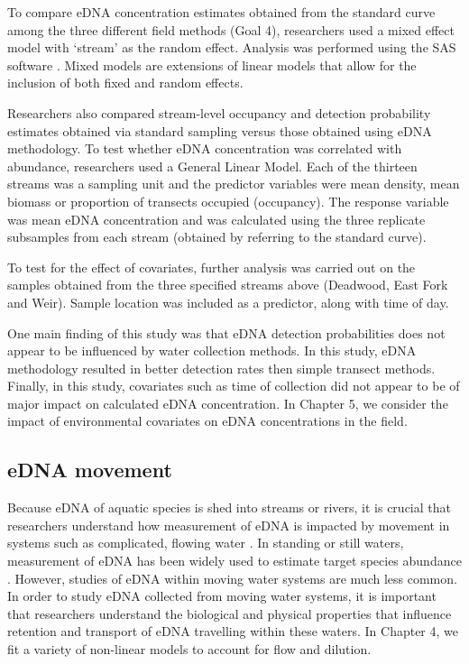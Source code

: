 \vspace{5mm}

To compare eDNA concentration estimates obtained from the standard curve among the three different field methods (Goal 4), researchers used a mixed effect model with `stream' as the random effect. Analysis was performed using the SAS software \citep{SAS}. Mixed models are extensions of linear models that allow for the inclusion of both fixed and random effects. 

\vspace{5mm}

Researchers also compared stream-level occupancy and detection probability estimates obtained via standard sampling versus those obtained using eDNA methodology. To test whether eDNA concentration was correlated with abundance, researchers used a General Linear Model. Each of the thirteen streams was a sampling unit and the predictor variables were mean density, mean biomass or proportion of transects occupied (occupancy). The response variable was mean eDNA concentration and was calculated using the three replicate subsamples from each stream (obtained by referring to the standard curve).

\vspace{5mm}

To test for the effect of covariates, further analysis was carried out on the samples obtained from the three specified streams above (Deadwood, East Fork and Weir). Sample location was included as a predictor, along with time of day.

\vspace{5mm}

One main finding of this study was that eDNA detection probabilities does not appear to be influenced by water collection methods. 
In this study, eDNA methodology resulted in better detection rates then simple transect methods.
Finally, in this study, covariates such as time of collection did not appear to be of major impact on calculated eDNA concentration.
In Chapter 5, we consider the impact of environmental covariates on eDNA concentrations in the field.

\newpage

\subsection{eDNA movement}

Because eDNA of aquatic species is shed into streams or rivers, it is crucial that researchers understand how measurement of eDNA is impacted by movement in systems such as complicated, flowing water \citep{ednatransport}. In standing or still waters, measurement of eDNA has been widely used to estimate target species abundance \citep{biomass}. However, studies of eDNA within moving water systems are much less common. In order to study eDNA collected from moving water systems, it is important that researchers understand the biological and physical properties that influence retention and transport of eDNA travelling within these waters.  In Chapter 4, we fit a variety of non-linear models to account for flow and dilution. 

